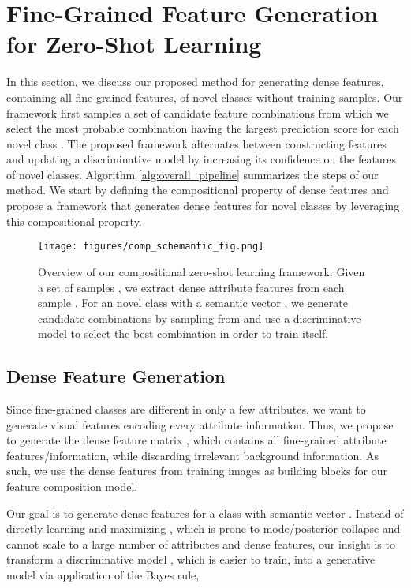 \documentclass[10pt,journal,compsoc]{IEEEtran}
\newcommand{\1}{\boldsymbol{1}}
\newcommand{\0}{\boldsymbol{0}}
\newcommand{\<}{\langle}
\renewcommand{\>}{\rangle}
\begin{document}
\section{Fine-Grained Feature Generation for Zero-Shot Learning}
\label{sec:generate_fine_grained_features}
In this section, we discuss our proposed method for generating dense features, containing all fine-grained features, of novel classes without training samples. 
Our framework first samples a set of candidate feature combinations from which we select the most probable combination having the largest prediction score  for each novel class . The proposed framework alternates between constructing features and updating a discriminative model  by increasing its confidence on the features of novel classes. Algorithm \ref{alg:overall_pipeline} summarizes the steps of our method. We start by defining the compositional property of dense features and propose a framework that generates dense features for novel classes by leveraging this compositional property.

\begin{figure*}[t]
\centering
\texttt{[image: figures/comp\_schemantic\_fig.png]}
\vspace{-0mm}
\caption{
\small{
Overview of our compositional zero-shot learning framework. Given a set of samples , we extract dense attribute features  from each sample . For an novel class  with a semantic vector , we generate candidate combinations by sampling from  and use a discriminative model  to select the best combination in order to train itself.
}
}

\label{fig:comp_schemantic_fig}
\end{figure*}


\subsection{Dense Feature Generation}
\label{sec:dense_feature_generation}
Since fine-grained classes are different in only a few attributes, we want to generate visual features encoding every attribute information. Thus, we propose to generate the dense feature matrix , which contains all fine-grained attribute features/information, while discarding irrelevant background information. As such, we use the dense features from training images  as building blocks for our feature composition model.

Our goal is to generate dense features  for a class  with semantic vector . Instead of directly learning and maximizing , which is prone to mode/posterior collapse and cannot scale to a large number of attributes and dense features, our insight is to transform a discriminative model , which is easier to train, into a generative model via application of the Bayes rule,
\end{document}
